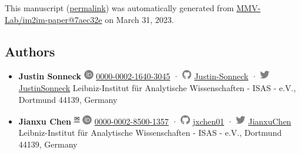 This manuscript
(\href{https://MMV-Lab.github.io/im2im-paper/v/7aec32e213021f4411b07c4ae3ddb6abc7fba11c/}{permalink})
was automatically generated
from \href{https://github.com/MMV-Lab/im2im-paper/tree/7aec32e213021f4411b07c4ae3ddb6abc7fba11c}{MMV-Lab/im2im-paper@7aec32e}
on March 31, 2023.

\hypertarget{authors}{%
\subsection{Authors}\label{authors}}

\begin{itemize}
\item
  \textbf{Justin Sonneck}
  \includegraphics[width=0.16667in,height=0.16667in]{images/orcid.svg}
  \href{https://orcid.org/0000-0002-1640-3045}{0000-0002-1640-3045}
  · \includegraphics[width=0.16667in,height=0.16667in]{images/github.svg}
  \href{https://github.com/Justin-Sonneck}{Justin-Sonneck}
  · \includegraphics[width=0.16667in,height=0.16667in]{images/twitter.svg}
  \href{https://twitter.com/JustinSonneck}{JustinSonneck}
  Leibniz-Institut für Analytische Wissenschaften - ISAS - e.V., Dortmund 44139, Germany
\item
  \textbf{Jianxu Chen}
  \textsuperscript{\protect\hyperlink{correspondence}{✉}}
  \includegraphics[width=0.16667in,height=0.16667in]{images/orcid.svg}
  \href{https://orcid.org/0000-0002-8500-1357}{0000-0002-8500-1357}
  · \includegraphics[width=0.16667in,height=0.16667in]{images/github.svg}
  \href{https://github.com/jxchen01}{jxchen01}
  · \includegraphics[width=0.16667in,height=0.16667in]{images/twitter.svg}
  \href{https://twitter.com/JianxuChen}{JianxuChen}
  Leibniz-Institut für Analytische Wissenschaften - ISAS - e.V., Dortmund 44139, Germany
\end{itemize}

